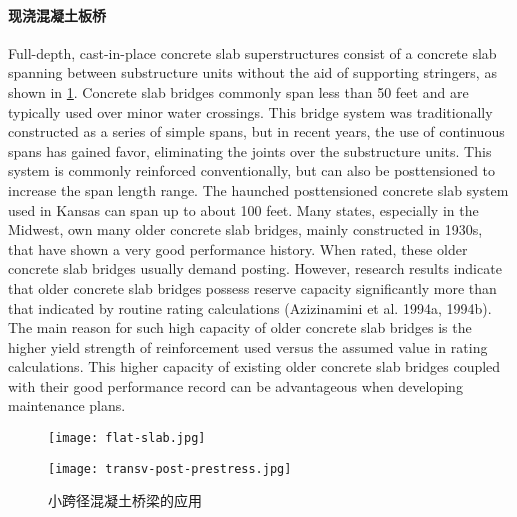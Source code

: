 \paragraph{现浇混凝土板桥}

Full-depth, cast-in-place concrete slab superstructures consist of a concrete slab spanning between substructure units without the aid of supporting stringers, as shown in \cref{fig:short-span-concrete-bridge-applications}. Concrete slab bridges commonly span less than 50 feet and are typically used over minor water crossings. This bridge system was traditionally constructed as a series of simple spans, but in recent years, the use of continuous spans has gained favor, eliminating the joints over the substructure units. This system is commonly reinforced conventionally, but can also be posttensioned to increase the span length range. The haunched posttensioned concrete slab system used in Kansas can span up to about 100 feet. Many states, especially in the Midwest, own many older concrete slab bridges, mainly constructed in 1930s, that have shown a very good performance history. When rated, these older concrete slab bridges usually demand posting. However, research results indicate that older concrete slab bridges possess reserve capacity significantly more than that indicated by routine rating calculations (Azizinamini et al. 1994a, 1994b). The main reason for such high capacity of older concrete slab bridges is the higher yield strength of reinforcement used versus the assumed value in rating calculations. This higher capacity of existing older concrete slab bridges coupled with their good performance record can be advantageous when developing maintenance plans.

\begin{figure}
  \begin{minipage}{0.49\linewidth}\centering
    \texttt{[image: flat-slab.jpg]}
  \end{minipage}\hfill
  \begin{minipage}{0.49\linewidth}\centering
    \texttt{[image: transv-post-prestress.jpg]}
  \end{minipage}
  \caption{小跨径混凝土桥梁的应用}
  \label{fig:short-span-concrete-bridge-applications}
\end{figure}

